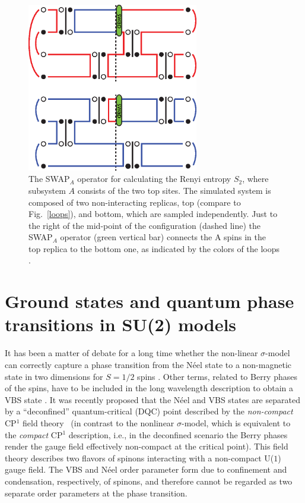 \documentclass[10pt,pre,aps,twocolumn,showpacs,superscriptaddress,floatfix]{revtex4-1}
\begin{document}
\begin{figure}
\includegraphics[width=7.5cm, clip]{fig02.eps}
\caption{The {\rm SWAP}$_A$ operator for calculating the Renyi entropy $S_2$, where subsystem $A$ consists of the two top sites. The simulated system is 
composed of two non-interacting replicas, top (compare to Fig.~\ref{loops}), and bottom, which are sampled independently. Just to the right of the mid-point 
of the configuration (dashed line) the {\rm SWAP}$_A$ operator (green vertical bar) connects the A spins in the top replica to the bottom one, as indicated by 
the colors of the loops \cite{Kallin11}.}
\label{swap}
\end{figure}

\section{Ground states and quantum phase transitions in SU(2) models}
\label{sec:su2models}

It has been a matter of debate for a long time whether the non-linear $\sigma$-model can correctly capture a phase transition from the N\'eel state 
to a non-magnetic state in two dimensions for $S=1/2$ spins \cite{Chakravarty89}. Other terms, related to Berry phases of the spins, have to be included in the long wavelength description to obtain a VBS state \cite{Read90,murthy1990:mono}. It was recently proposed that the N\'eel and VBS states are separated
by a ``deconfined'' quantum-critical (DQC) point \cite{Senthil04a} described by the {\it non-compact} CP$^1$ field theory~\cite{Motrunich04} (in contrast to the nonlinear 
$\sigma$-model, which is equivalent to the {\it compact} CP$^1$ description, i.e., in the deconfined scenario the Berry phases render the gauge field effectively
non-compact at the critical point).
This field theory describes two flavors of spinons interacting with a non-compact U($1$) gauge field.  The VBS and N\'eel order parameter form due to confinement and condensation, 
respectively, of spinons, and therefore cannot be regarded as two separate order parameters at the phase transition.
\end{document}
